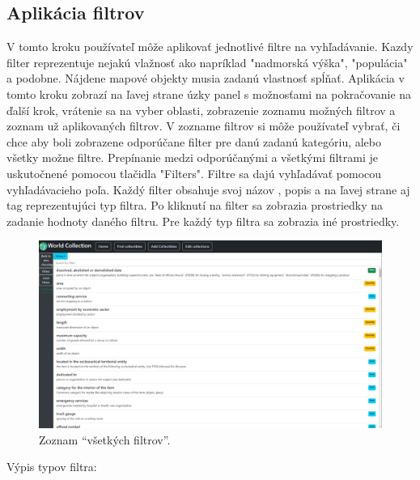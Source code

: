 \subsection*{Aplikácia filtrov}
V tomto kroku používateľ môže aplikovať jednotlivé filtre na vyhľadávanie.
Kazdy filter reprezentuje nejakú vlažnosť ako napríklad "nadmorská výška", "populácia" a podobne. Nájdene mapové objekty musia zadanú vlastnosť spĺňať.
Aplikácia v tomto kroku zobrazí na ľavej strane úzky panel s možnosťami na pokračovanie na ďalší krok, vrátenie sa na vyber oblasti,
zobrazenie zoznamu možných filtrov a zoznam už aplikovaných filtrov.
V zozname filtrov si môže používateľ vybrať, či chce aby boli zobrazene odporúčane filter pre danú zadanú kategóriu, alebo všetky možne filtre. Prepínanie medzi odporúčanými a všetkými filtrami je uskutočnené pomocou tlačidla "Filters".
Filtre sa dajú vyhľadávať pomocou vyhľadávacieho poľa. Každý filter obsahuje svoj názov , popis a na ľavej strane aj tag reprezentujúci typ filtra.
Po kliknutí na filter sa zobrazia prostriedky na zadanie hodnoty daného filtru. Pre každý typ filtra sa zobrazia iné prostriedky.
\begin{figure}[h]
      \includegraphics[width=140mm]{../img/ud-vyber-filtrov.png}
      \centering
      \caption{Zoznam “všetkých filtrov”.}
\end{figure}
Výpis typov filtra:
